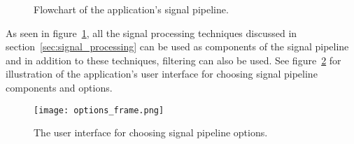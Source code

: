 \begin{figure}[h!]
	
	\caption{Flowchart of the application's signal pipeline.}
	\label{fig:signal_pipeline}
\end{figure}

As seen in figure~\ref{fig:signal_pipeline}, all the signal processing techniques discussed in section~\ref{sec:signal_processing} can be used as components of the signal pipeline and in addition to these techniques, filtering can also be used. See figure~\ref{fig:options_frame} for illustration of the application's user interface for choosing signal pipeline components and options.

\begin{figure}[h]
	\centering
	\texttt{[image: options\_frame.png]}
	\caption{The user interface for choosing signal pipeline options.}
	\label{fig:options_frame}
\end{figure}

